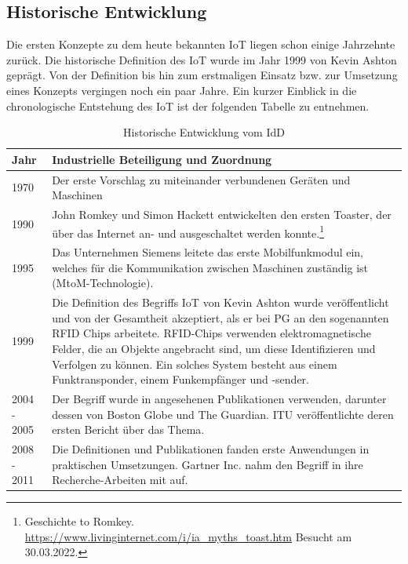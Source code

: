     \subsection{Historische Entwicklung}
        Die ersten Konzepte zu dem heute bekannten \acs{IoT} liegen schon einige Jahrzehnte zurück. 
        Die historische Definition des \acl{IoT} wurde im Jahr 1999 von Kevin Ashton geprägt. Von der 
        Definition bis hin zum erstmaligen Einsatz bzw. zur Umsetzung eines Konzepts vergingen noch 
        ein paar Jahre. Ein kurzer Einblick in die chronologische Entstehung des \acs{IoT} ist der 
        folgenden Tabelle zu entnehmen. 
        \begin{table}[hbt!]
            \begin{center}
                \begin{tabular}{| p{3cm} | p{12.75cm} | }
                    \hline
                        \textbf{Jahr} & \textbf{Industrielle Beteiligung und Zuordnung} \\
                    \hline
                        1970 & Der erste Vorschlag zu miteinander verbundenen Geräten und Maschinen \\ 
                    \hline
                        1990 & John Romkey und Simon Hackett entwickelten den ersten Toaster, der über das Internet an- und ausgeschaltet werden konnte.\footnote{Geschichte to Romkey. \url{https://www.livinginternet.com/i/ia_myths_toast.htm} Besucht am 30.03.2022.} \\ 
                    \hline
                        1995 & Das Unternehmen Siemens leitete das erste Mobilfunkmodul ein, welches für die Kommunikation zwischen Maschinen zuständig ist (\acs{MtoM}-Technologie).\\ 
                    \hline
                        1999 & Die Definition des Begriffs \acs{IoT} von Kevin Ashton wurde veröffentlicht und von der Gesamtheit akzeptiert, als er bei \ac{PG} an den sogenannten \ac{RFID} Chips arbeitete. \acs{RFID}-Chips verwenden elektromagnetische Felder, die an Objekte angebracht sind, um diese Identifizieren und Verfolgen zu können. Ein solches System besteht aus einem Funktransponder, einem Funkempfänger und -sender. \\ 
                    \hline
                        2004 - 2005 & Der Begriff wurde in angesehenen Publikationen verwenden, darunter dessen von Boston Globe und The Guardian. \ac{ITU} veröffentlichte deren ersten Bericht über das Thema. \\ 
                    \hline
                        2008 - 2011 & Die Definitionen und Publikationen fanden erste Anwendungen in praktischen Umsetzungen. Gartner Inc. nahm den Begriff in ihre Recherche-Arbeiten mit auf. \\ 
                    \hline
                \end{tabular}
            \end{center}
            \caption{Historische Entwicklung vom \acl{IdD} \cite{Durga2020}}
            \label{table:iothistory}
        \end{table}
